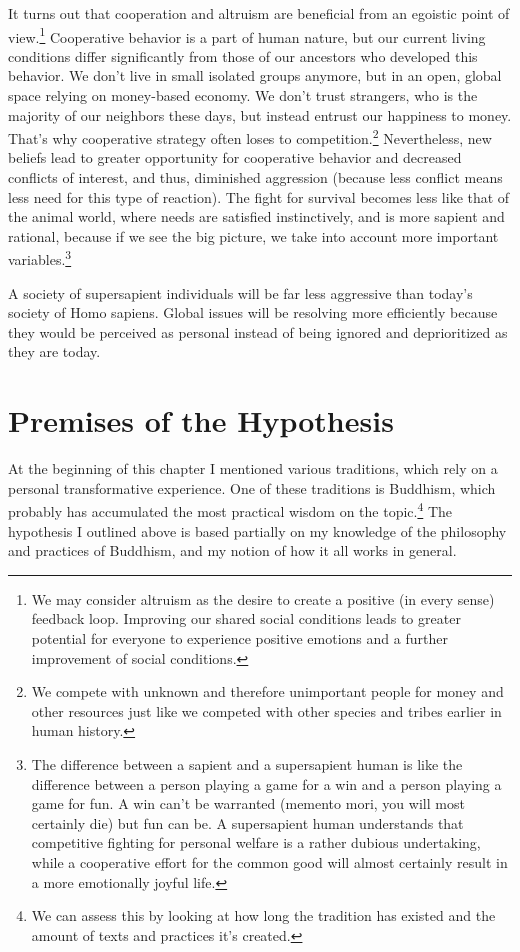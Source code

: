 \documentclass[12pt]{report}
\begin{document}
\noindent It turns out that cooperation and altruism are beneficial from an egoistic point of view.\footnote{We may consider altruism as the desire to create a positive (in every sense) feedback loop. Improving our shared social conditions leads to greater potential for everyone to experience positive emotions and a further improvement of social conditions.} Cooperative behavior is a part of human nature, but our current living conditions differ significantly from those of our ancestors who developed this behavior. We don’t live in small isolated groups anymore, but in an open, global space relying on money-based economy. We don’t trust strangers, who is the majority of our neighbors these days, but instead entrust our happiness to money. That’s why cooperative strategy often loses to competition.\footnote{We compete with unknown and therefore unimportant people for money and other resources just like we competed with other species and tribes earlier in human history.} Nevertheless, new beliefs lead to greater opportunity for cooperative behavior and decreased conflicts of interest, and thus, diminished aggression (because less conflict means less need for this type of reaction). The fight for survival becomes less like that of the animal world, where needs are satisfied instinctively, and is more sapient and rational, because if we see the big picture, we take into account more important variables.\footnote{The difference between a sapient and a supersapient human is like the difference between a person playing a game for a win and a person playing a game for fun. A win can’t be warranted (memento mori, you will most certainly die) but fun can be. A supersapient human understands that competitive fighting for personal welfare is a rather dubious undertaking, while a cooperative effort for the common good will almost certainly result in a more emotionally joyful life.}

\noindent A society of supersapient individuals will be far less aggressive than today’s society of Homo sapiens. Global issues will be resolving more efficiently because they would be perceived as personal instead of being ignored and deprioritized as they are today.

\section*{Premises of the Hypothesis}

At the beginning of this chapter I mentioned various traditions, which rely on a personal transformative experience. One of these traditions is Buddhism, which probably has accumulated the most practical wisdom on the topic.\footnote{We can assess this by looking at how long the tradition has existed and the amount of texts and practices it’s created.} The hypothesis I outlined above is based partially on my knowledge of the philosophy and practices of Buddhism, and my notion of how it all works in general.
\end{document}

